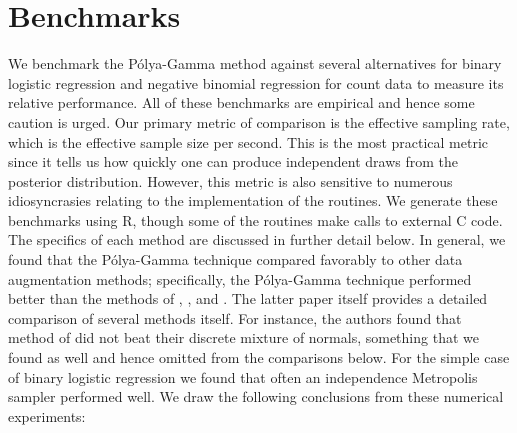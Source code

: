 \documentclass{article}
\newcommand{\Polya}{P\'{o}lya}
\begin{document}
\section{Benchmarks}

We benchmark the \Polya-Gamma method against several alternatives for binary
logistic regression and negative binomial regression for count data to measure
its relative performance.  All of these benchmarks are empirical and hence some
caution is urged.  Our primary metric of comparison is the effective sampling
rate, which is the effective sample size per second.  This is the most practical
metric since it tells us how quickly one can produce independent draws from the
posterior distribution.  However, this metric is also sensitive to numerous
idiosyncrasies relating to the implementation of the routines.  We generate
these benchmarks using R, though some of the routines make calls to external C
code.  The specifics of each method are discussed in further detail below.  In
general, we found that the \Polya-Gamma technique compared favorably to other
data augmentation methods; specifically, the \Polya-Gamma technique performed
better than the methods of \cite{obrien-dunson-2004},
\cite{gramacy-polson-2012}, and \cite{fruhwirth-schnatter-fruhwirth-2010}.  The
latter paper itself provides a detailed comparison of several methods itself.
For instance, the authors found that method of \cite{holmes-held-2006} did not
beat their discrete mixture of normals, something that we found as well and
hence omitted from the comparisons below.  For the simple case of binary
logistic regression we found that often an independence Metropolis sampler
performed well.  We draw the following conclusions from these numerical
experiments:
\end{document}
